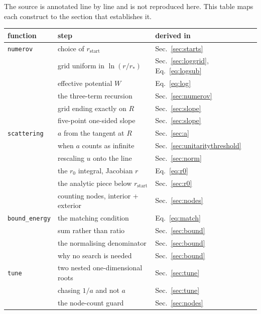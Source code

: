 \documentclass[11pt,a4paper]{article}
\begin{document}
The source is annotated line by line and is not reproduced here. This table
maps each construct to the section that establishes it.

\begin{center}
\small
\begin{tabular}{@{}lll@{}}
\toprule
function & step & derived in \\
\midrule
\texttt{numerov}
  & choice of $r_{\text{start}}$        & Sec.~\ref{sec:starts} \\
  & grid uniform in $\ln(r/r_*)$        & Sec.~\ref{sec:loggrid}, Eq.~\eqref{eq:logsub} \\
  & effective potential $W$             & Eq.~\eqref{eq:log} \\
  & the three-term recursion            & Sec.~\ref{sec:numerov} \\
  & grid ending exactly on $R$          & Sec.~\ref{sec:slope} \\
  & five-point one-sided slope          & Sec.~\ref{sec:slope} \\
\addlinespace
\texttt{scattering}
  & $a$ from the tangent at $R$         & Sec.~\ref{sec:a} \\
  & when $a$ counts as infinite         & Sec.~\ref{sec:unitaritythreshold} \\
  & rescaling $u$ onto the line         & Sec.~\ref{sec:norm} \\
  & the $r_0$ integral, Jacobian $r$    & Eq.~\eqref{eq:r0} \\
  & the analytic piece below $r_{\text{start}}$ & Sec.~\ref{sec:r0} \\
  & counting nodes, interior + exterior & Sec.~\ref{sec:nodes} \\
\addlinespace
\texttt{bound\_energy}
  & the matching condition              & Eq.~\eqref{eq:match} \\
  & sum rather than ratio               & Sec.~\ref{sec:bound} \\
  & the normalising denominator         & Sec.~\ref{sec:bound} \\
  & why no search is needed             & Sec.~\ref{sec:bound} \\
\addlinespace
\texttt{tune}
  & two nested one-dimensional roots    & Sec.~\ref{sec:tune} \\
  & chasing $1/a$ and not $a$           & Sec.~\ref{sec:tune} \\
  & the node-count guard                & Sec.~\ref{sec:nodes} \\
\bottomrule
\end{tabular}
\end{center}
\end{document}
